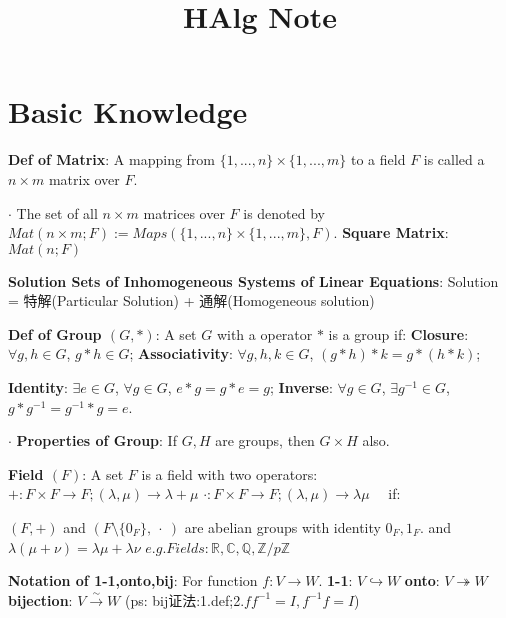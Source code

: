 \documentclass[9pt]{article}
\title{HAlg Note}
\author{}
\date{}
\newcommand{\oto}{\hookrightarrow}
\newcommand{\onto}{\twoheadrightarrow}
\newcommand{\bij}{\stackrel{\sim}{\rightarrow}}
\begin{document}
\maketitle
\thispagestyle{fancy}
\vspace{-3.5cm}

\fontsize{10pt}{11pt}\selectfont
\setlength{\parindent}{8pt}


\section{Basic Knowledge} %

\textbf{Def of Matrix}: A mapping from $\{1,...,n\}\times\{1,...,m\}$ to a field $F$ is called a $n\times m$ matrix over $F$.

$\cdot$ The set of all $n\times m$ matrices over $F$ is denoted by $Mat(n\times m;F):=Maps(\{1,...,n\}\times\{1,...,m\},F)$. \quad \textbf{Square Matrix}: $Mat(n;F)$

\textbf{Solution Sets of Inhomogeneous Systems of Linear Equations}: {\small Solution = 特解(Particular Solution) + 通解(Homogeneous solution)}

\textbf{Def of Group $(G,*)$}: A set $G$ with a operator $*$ is a group if: {\small \textbf{Closure}: $\forall g,h\in G$, $g*h\in G$; \textbf{Associativity}: $\forall g,h,k\in G$, $(g*h)*k=g*(h*k)$;}

\hspace{85pt} {\small \textbf{Identity}: $\exists e\in G$, $\forall g\in G$, $e*g=g*e=g$; \textbf{Inverse}: $\forall g\in G$, $\exists g^{-1}\in G$, $g*g^{-1}=g^{-1}*g=e$.}

$\cdot$ \textbf{Properties of Group}: If $G,H$ are groups, then $G\times H$ also.

\textbf{Field $(F)$}: A set $F$ is a field with two operators: $+:F\times F\to F;(\lambda,\mu)\to\lambda+\mu$ $\cdot:F\times F\to F;(\lambda,\mu)\to\lambda\mu$ \ \ if:

\quad \quad \quad \quad $(F,+)$ and $(F\setminus\{0_F\}, \ \cdot \ )$ are abelian groups with identity $0_F,1_F$. \quad and \quad $\lambda(\mu+\nu)=\lambda\mu+\lambda\nu$ \quad \quad $e.g. Fields:\mathbb{R},\mathbb{C},\mathbb{Q},\mathbb{Z}/p\mathbb{Z}$

\textbf{Notation of 1-1,onto,bij}: For function $f:V\to W$. \quad \textbf{1-1}: $V\oto W$ \quad \textbf{onto}: $V\onto  W$ \quad \textbf{bijection}: $V\bij W$ {\tiny (ps: bij证法:1.def;2.$f f^{-1}=I,f^{-1}f=I$)}
\end{document}
